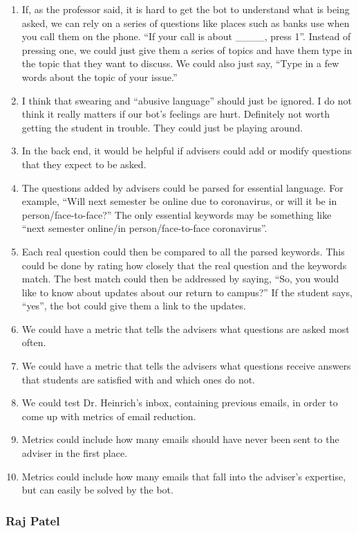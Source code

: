 \documentclass[titlepage, 12pt]{article}
\begin{document}
\begin{enumerate}
    \item If, as the professor said, it is hard to get the bot to understand what is being asked, we can rely on a series of questions like places such as banks use when you call them on the phone. “If your call is about \_\_\_\_, press 1”. Instead of pressing one, we could just give them a series of topics and have them type in the topic that they want to discuss. We could also just say, “Type in a few words about the topic of your issue.” 
    \item I think that swearing and “abusive language” should just be ignored. I do not think it really matters if our bot’s feelings are hurt. Definitely not worth getting the student in trouble. They could just be playing around. 
    \item In the back end, it would be helpful if advisers could add or modify questions that they expect to be asked. 
    \item The questions added by advisers could be parsed for essential language. For example, “Will next semester be online due to coronavirus, or will it be in person/face-to-face?” The only essential keywords may be something like “next semester online/in person/face-to-face coronavirus”.  
    \item Each real question could then be compared to all the parsed keywords. This could be done by rating how closely that the real question and the keywords match. The best match could then be addressed by saying, “So, you would like to know about updates about our return to campus?” If the student says, “yes”, the bot could give them a link to the updates. 
    \item We could have a metric that tells the advisers what questions are asked most often. 
    \item We could have a metric that tells the advisers what questions receive answers that students are satisfied with and which ones do not. 
    \item We could test Dr. Heinrich’s inbox, containing previous emails, in order to come up with metrics of email reduction. 
    \item Metrics could include how many emails should have never been sent to the adviser in the first place. 
    \item Metrics could include how many emails that fall into the adviser’s expertise, but can easily be solved by the bot.
\end{enumerate}

\subsubsection{Raj Patel}
\end{document}
